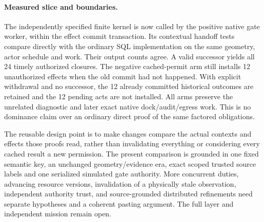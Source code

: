 \documentclass{article}
\begin{document}
\paragraph{Measured slice and boundaries.}
The independently specified finite kernel is now called by the
positive native gate worker, within the effect commit transaction.
Its contextual handoff tests compare directly with the ordinary
SQL implementation on the same geometry, actor schedule and work.
Their output counts agree. A valid successor yields all 24 timely
authorized closures. The negative cached-permit arm still
installs 12 unauthorized effects when the old commit had not
happened. With explicit withdrawal and no successor, the 12
already committed historical outcomes are retained and the 12
pending acts are not installed. All arms preserve the unrelated
diagnostic and later exact native dock/audit/egress work.
This is no dominance claim over an ordinary direct proof of
the same factored obligations.

The reusable design point is to make changes compare the actual
contexts and effects those proofs read, rather than invalidating
everything or considering every cached result a new permission.
The present comparison is grounded in one fixed semantic key,
an unchanged geometry/evidence era, exact scoped trusted source
labels and one serialized simulated gate authority. More concurrent
duties, advancing resource versions, invalidation of a physically
stale observation, independent authority trust, and source-grounded
distributed refinements need separate hypotheses and a coherent
pasting argument. The full layer and independent mission
remain open.
\end{document}
